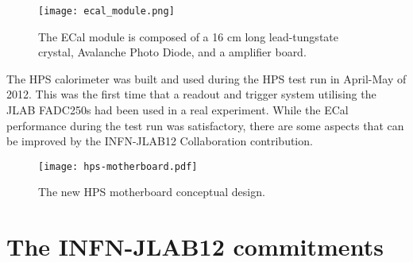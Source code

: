 \documentclass[11pt]{report}
\begin{document}
\begin{figure*}[t]
\texttt{[image: ecal\_module.png]}
\caption{\small{The ECal module is composed of a 16 cm long lead-tungstate crystal, Avalanche Photo Diode, and a amplifier 
board.}}\label{fig:module}
\end{figure*}

The HPS calorimeter was built and used during the HPS test run in April-May of 2012. This was the first time that 
a readout and trigger system utilising the JLAB FADC250s had been used in a real experiment. 
While the ECal performance during the test run was satisfactory, there are some aspects that can be improved by the INFN-JLAB12 Collaboration contribution.

\begin{figure*}[t]
\begin{center}
\texttt{[image: hps-motherboard.pdf]}
\caption{\small{The new HPS motherboard conceptual design.}}\label{fig:new_mb}
\end{center}
\end{figure*}
\section{The INFN-JLAB12 commitments}
\end{document}
